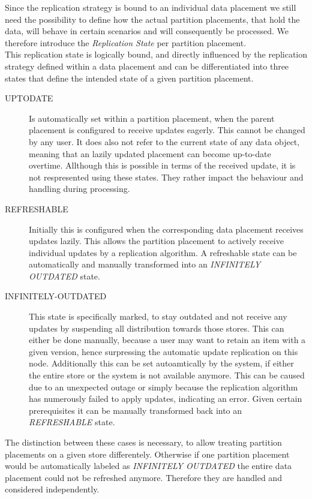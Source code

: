 Since the replication strategy is bound to an individual data placement we still need the possibility to 
define how the actual partition placements, that hold the data, will behave in certain scenarios and will consequently be processed.
We therefore introduce the \emph{Replication State} per partition placement.\\

This replication state is logically bound, and directly influenced by the replication strategy defined within a data placement
and can be differentiated into three states that define the intended state of a given partition placement. 
\begin{description}
    \item [UPTODATE] Is automatically set within a partition placement, when the parent placement is configured to receive updates eagerly.
    This cannot be changed by any user. It does also not refer to the current state of any data object, meaning that an lazily updated placement can become up-to-date overtime.
    Allthough this is possible in terms of the received update, it is not respresented using these states. They rather impact the behaviour and handling during processing.
    
    \item [REFRESHABLE] Initially this is configured when the corresponding data placement receives updates lazily. This allows the partition placement to actively receive 
    individual updates by a replication algorithm. A refreshable state can be automatically and manually transformed into an \emph{INFINITELY OUTDATED} state.

    \item [INFINITELY-OUTDATED] This state is specifically marked, to stay outdated and not receive any updates by suspending all distribution towards those stores.
    This can either be done manually, because a user may want to
    retain an item with a given version, hence surpressing the automatic update replication on this node. Additionally this can be set autoamtically by the system, 
    if either the entire store or the system is not available anymore. This can be caused due to an unexpected outage or simply because the replication algorithm has 
    numerously failed to apply updates, indicating an error. Given certain prerequisites it can be manually transformed back into an \emph{REFRESHABLE} state.

\end{description}

The distinction between these cases is necessary, to allow treating partition placements on a given store differentely. 
Otherwise if one partition placement would be automatically labeled as \emph{INFINITELY OUTDATED} the entire data placement could not be refreshed anymore.
Therefore they are handled and considered independently.

